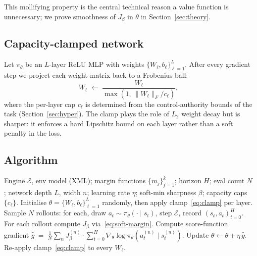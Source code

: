 This mollifying property is the central technical reason a value function
is unnecessary; we prove smoothness of $J_\beta$ in $\theta$ in
Section~\ref{sec:theory}.

\subsection{Capacity-clamped network}
\label{sec:capacity}

Let $\pi_\theta$ be an $L$-layer ReLU MLP with weights
$\{W_\ell, b_\ell\}_{\ell=1}^L$. After every gradient step we project
each weight matrix back to a Frobenius ball:
\begin{equation}
  \label{eq:clamp}
  W_\ell \;\leftarrow\;
  \frac{W_\ell}{\max(1,\, \|W_\ell\|_F / c_\ell)},
\end{equation}
where the per-layer cap $c_\ell$ is determined from the
control-authority bounds of the task (Section~\ref{sec:hyper}). The
clamp plays the role of $L_2$ weight decay but is sharper: it enforces
a hard Lipschitz bound on each layer rather than a soft penalty in the
loss.

\subsection{Algorithm}
\label{sec:algorithm}

\begin{algorithm}[H]
\caption{Minimalist policy gradient (\textsc{MinPG}).}
\label{alg:minpg}
\begin{algorithmic}[1]
\Require Engine $\mathcal{E}$, env model (XML); margin functions
$\{m_j\}_{j=1}^k$; horizon $H$; eval count $N$;
network depth $L$, width $n$;
learning rate $\eta$; soft-min sharpness $\beta$;
capacity caps $\{c_\ell\}$.
\State Initialise $\theta = \{W_\ell, b_\ell\}_{\ell=1}^L$ randomly,
then apply clamp~\eqref{eq:clamp} per layer.
  \State Sample $N$ rollouts: for each, draw
  $a_t \sim \pi_\theta(\cdot \mid s_t)$, step $\mathcal{E}$, record
  $(s_t, a_t)_{t=0}^H$.
  \State For each rollout compute $J_\beta$ via~\eqref{eq:soft-margin}.
  \State Compute score-function gradient
  $\hat g \;=\; \frac{1}{N}\sum_n J_\beta^{(n)} \cdot
  \sum_{t=0}^H \nabla_\theta \log \pi_\theta(a_t^{(n)} \mid s_t^{(n)})$.
  \State Update $\theta \leftarrow \theta + \eta\, \hat g$.
  \State Re-apply clamp~\eqref{eq:clamp} to every $W_\ell$.
\EndFor
\end{algorithmic}
\end{algorithm}

